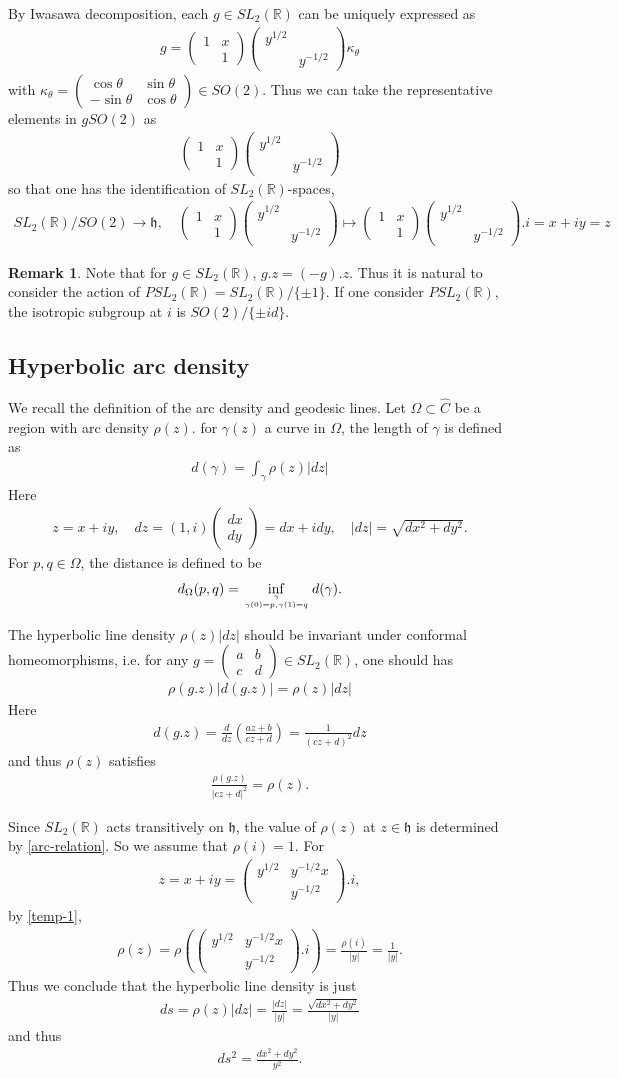 \documentclass[11pt,reqno]{amsart}
\newcommand{\bea}{\begin{eqnarray}}
\newcommand{\eea}{\end{eqnarray}}
\newcommand{\bna}{\begin{eqnarray*}}
\newcommand{\ena}{\end{eqnarray*}}
\newcommand{\bma}{\begin{pmatrix}}
\newcommand{\ema}{\end{pmatrix}}
\newcommand{\mk}{\mathfrak}
\def\R{\mathbb{R}}
\theoremstyle{definition}
\newtheorem{remark}{Remark}
\begin{document}
By Iwasawa decomposition,  each $g\in SL_2(\R)$ can be uniquely expressed as
\bna
g=\bma 1&x\\&1\ema\bma y^{1/2}\\&y^{-1/2}\ema\kappa_\theta
\ena
with $\kappa_\theta=\bma\cos\theta&\sin\theta\\-\sin\theta&\cos\theta\ema\in SO(2)$.
Thus we can take the representative elements in $g SO(2)$ as
\bna
\bma 1&x\\&1\ema\bma y^{1/2}\\&y^{-1/2}\ema
\ena
so that one has the identification of $SL_2(\R)$-spaces,
\bna
SL_2(\R)/SO(2)\rightarrow\mk h,\quad
\bma 1&x\\&1\ema\bma y^{1/2}\\&y^{-1/2}\ema\mapsto \bma 1&x\\&1\ema\bma y^{1/2}\\&y^{-1/2}\ema.i=x+iy=z
\ena
\begin{remark}
Note that for $g\in SL_2(\R)$, $g.z=(-g).z$.
Thus it is natural to consider the action of $PSL_2(\R)=SL_2(\R)/\{\pm 1\}$.
If one consider $PSL_2(\R)$, the isotropic subgroup
at $i$ is $SO(2)/\{\pm id\}$.
\end{remark}
\subsection{Hyperbolic arc density}
We recall the definition of the arc density and geodesic lines.
Let $\Omega\subset \widehat C$ be a region with arc density $\rho(z)$.
for $\gamma(z)$ a curve  in $\Omega$, the length of $\gamma$ is defined as
\bna
d(\gamma)=\int_{\gamma}\rho(z)|dz|
\ena
Here
\bna
z=x+iy,\quad dz=(1,i)\bma dx\\ dy\ema=dx+idy,\quad
|dz|=\sqrt{dx^2+dy^2}.
\ena
For $p,q\in\Omega$, the distance  is defined to be
\bna
d_\Omega(p,q)=\inf_{\gamma\atop{\gamma(0)=p,\gamma(1)=q}}d(\gamma).
\ena
\medskip

The hyperbolic line density $\rho(z)|dz|$ should be invariant under
conformal homeomorphisms, i.e.  for any $g=\bma a&b\\c&d\ema\in SL_2(\R)$, one should has
\bea
\rho(g.z)|d(g.z)|=\rho(z)|dz|\label{arc-relation}
\eea
Here
\bna
d(g.z)=\frac{d}{dz}\left(\frac{az+b}{cz+d}\right)=\frac{1}{(cz+d)^2}dz
\ena
and thus $\rho(z)$ satisfies
\bea
\frac{\rho(g.z)}{|cz+d|^2}=\rho(z).\label{temp-1}
\eea

Since $SL_2(\R)$ acts transitively on $\mk h$,
the value of $\rho(z)$ at $z\in \mk h$ is determined by
\eqref{arc-relation}.
So we assume that $\rho(i)=1$.
For
\bna
z=x+iy=\bma y^{1/2}&y^{-1/2}x\\&y^{-1/2}\ema.i,
\ena
by \eqref{temp-1},
\bna
\rho(z)=\rho\left(\bma y^{1/2}&y^{-1/2}x\\&y^{-1/2}\ema.i\right)
=\frac{\rho(i)}{|y|}=\frac{1}{|y|}.
\ena
Thus we conclude that the hyperbolic line density is just
\bna
ds=\rho(z)|dz|=\frac{|dz|}{|y|}=\frac{\sqrt{dx^2+dy^2}}{|y|}
\ena
and thus
\bea
ds^2=\frac{dx^2+dy^2}{y^2}.\label{hyperbolic-line-density}
\eea
\end{document}
